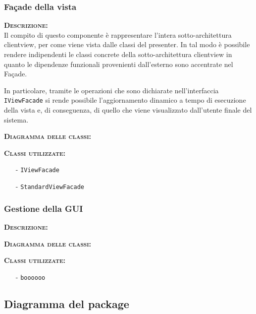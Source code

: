\subsubsection{Façade della vista}
\begin{description}
	\item{\scshape\bfseries Descrizione:}\\
Il compito di questo componente è rappresentare l'intera sotto-architettura clientview, per come viene vista dalle classi del presenter. In tal modo è possibile rendere indipendenti le classi concrete della sotto-architettura clientview in quanto le dipendenze funzionali provenienti dall'esterno sono accentrate nel Façade.

In particolare, tramite le operazioni che sono dichiarate nell'interfaccia \texttt{IViewFacade} si rende possibile l'aggiornamento dinamico a tempo di esecuzione della vista e, di conseguenza, di quello che viene visualizzato dall'utente finale del sistema.
	\item{\scshape\bfseries Diagramma delle classi:}
	\item{\scshape\bfseries Classi utilizzate:} 
	\begin{itemize}[noitemsep,nolistsep]
		\item[-] \texttt{IViewFacade}
		\item[-] \texttt{StandardViewFacade}
	\end{itemize}  
\end{description}

\subsubsection{Gestione della GUI}
\begin{description}
	\item{\scshape\bfseries Descrizione:} 
	\item{\scshape\bfseries Diagramma delle classi:}
	\item{\scshape\bfseries Classi utilizzate:} 
	\begin{itemize}[noitemsep,nolistsep]
		\item[-] \texttt{boooooo}
	\end{itemize}  
\end{description}

\subsection{Diagramma del package}

